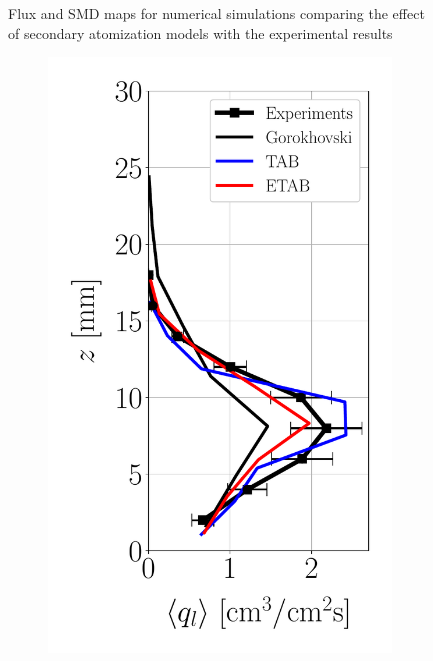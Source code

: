 \begin{figure}[t!]
\caption{Flux and SMD maps for numerical simulations comparing the effect of secondary atomization models with the experimental results}
\label{fig:maps_LGS_JICF_second_atom_models}
\end{figure}


\begin{figure}[h!]
\flushleft
\begin{subfigure}[b]{0.2\textwidth}
	\flushleft
   \includegraphics[scale=0.35]{./part2_developments/figures_ch6_lagrangian_JICF/params_breakup_model/profiles/flux_along_z}

\end{subfigure}
\end{figure}
